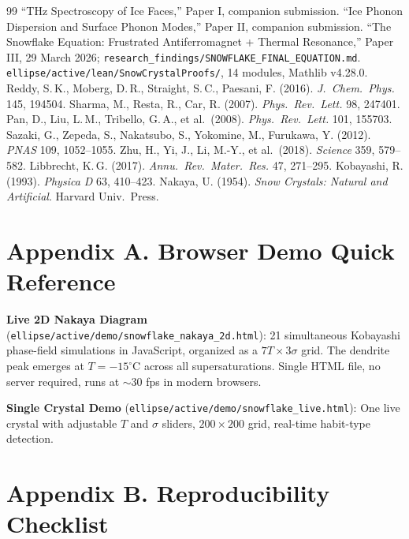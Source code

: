 \documentclass[11pt,a4paper]{article}
\begin{document}
\begin{thebibliography}{99}
\small
{} ``THz Spectroscopy of Ice Faces,'' Paper I, companion submission.
 ``Ice Phonon Dispersion and Surface Phonon Modes,'' Paper II, companion submission.
 ``The Snowflake Equation: Frustrated Antiferromagnet + Thermal Resonance,'' Paper III, 29 March 2026; \texttt{research\_findings/SNOWFLAKE\_FINAL\_EQUATION.md}.
 \texttt{ellipse/active/lean/SnowCrystalProofs/}, 14 modules, Mathlib v4.28.0.
 Reddy, S.\,K., Moberg, D.\,R., Straight, S.\,C., Paesani, F. (2016). \emph{J.\ Chem.\ Phys.} 145, 194504.
 Sharma, M., Resta, R., Car, R. (2007). \emph{Phys.\ Rev.\ Lett.} 98, 247401.
 Pan, D., Liu, L.\,M., Tribello, G.\,A., et al.\ (2008). \emph{Phys.\ Rev.\ Lett.} 101, 155703.
 Sazaki, G., Zepeda, S., Nakatsubo, S., Yokomine, M., Furukawa, Y. (2012). \emph{PNAS} 109, 1052–1055.
 Zhu, H., Yi, J., Li, M.-Y., et al.\ (2018). \emph{Science} 359, 579–582.
 Libbrecht, K.\,G. (2017). \emph{Annu.\ Rev.\ Mater.\ Res.} 47, 271–295.
 Kobayashi, R. (1993). \emph{Physica D} 63, 410–423.
 Nakaya, U. (1954). \emph{Snow Crystals: Natural and Artificial}. Harvard Univ.\ Press.
\end{thebibliography}

\appendix
\section*{Appendix A. Browser Demo Quick Reference}

\textbf{Live 2D Nakaya Diagram} (\texttt{ellipse/active/demo/snowflake\_nakaya\_2d.html}):
21 simultaneous Kobayashi phase-field simulations in JavaScript, organized as a $7T \times 3\sigma$ grid. The dendrite peak emerges at $T=-15^\circ$C across all supersaturations. Single HTML file, no server required, runs at $\sim$30 fps in modern browsers.

\textbf{Single Crystal Demo} (\texttt{ellipse/active/demo/snowflake\_live.html}):
One live crystal with adjustable $T$ and $\sigma$ sliders, $200\times 200$ grid, real-time habit-type detection.

\section*{Appendix B. Reproducibility Checklist}
\end{document}

